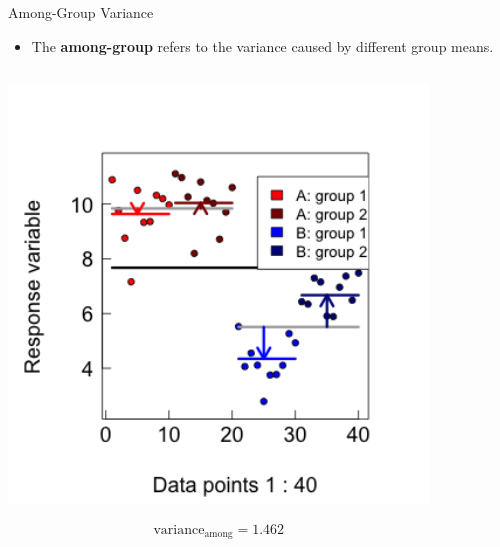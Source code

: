 \documentclass{beamer}
\begin{document}
\begin{frame}{Among-Group Variance}
  \begin{itemize}
    \item The \textbf{among-group} refers to the variance caused by different group means.
  \end{itemize}
  \begin{columns}[onlytextwidth] 
  \begin{column}{0.5\textwidth}
  \begin{center}
        \includegraphics[width=0.999\textwidth]{lectures/day_1_intro_to_mems/figures/unnamed-chunk-27-1.png}
      \end{center}
      \[ \text{variance}_{\text{among}} = 1.462 \]
  \end{column}
    \hspace{0.02\textwidth} %
    \begin{column}{0.5\textwidth}
      \begin{center}

\end{center}
\end{column}
\end{columns}
\end{frame}
\end{document}
